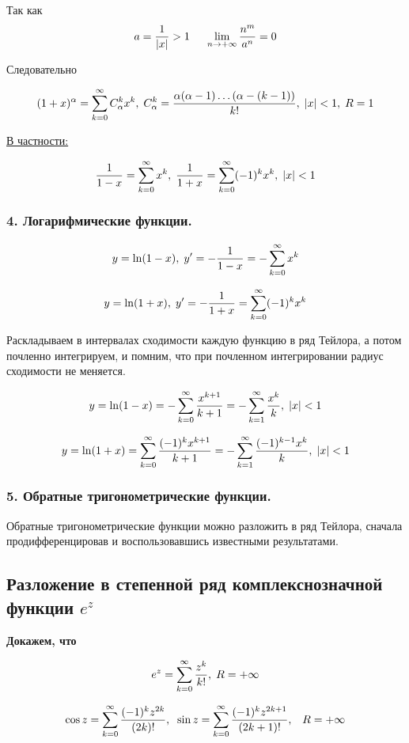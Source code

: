 Так как 
$$
a = \frac{1}{|x|} > 1 \hspace{0.5cm} \lim_{n \rightarrow + \infty} \frac{n^m}{a^n} = 0$$

Следовательно 

$$
(1 + x)^{\alpha} = \sum^{\infty}_{k = 0} C_{\alpha}^k x^k, \; C_{\alpha}^k = \frac{\alpha (\alpha - 1) \ldots (\alpha - (k -1))}{k!}, \; |x| < 1, \; R = 1 
$$

\underline{В частности:}

$$
\frac{1}{1 - x} = \sum^{\infty}_{k = 0} x^k, \; \frac{1}{1 + x} = \sum^{\infty}_{k = 0} (-1)^k x^k, \; |x| < 1
$$

\subsubsection*{4. Логарифмические функции.}



$$
y = \ln(1 - x), \; y' = - \frac{1}{1 - x} = - \sum^{\infty}_{k = 0} x^k
$$

$$
y = \ln(1 + x), \; y' = - \frac{1}{1 + x} = \sum^{\infty}_{k = 0} (-1)^k x^k
$$

Раскладываем в интервалах сходимости каждую функцию в ряд Тейлора, а потом почленно интегрируем, и помним, что при почленном интегрировании радиус сходимости не меняется. 

$$ 
y = \ln(1 - x) = - \sum^{\infty}_{k = 0} \frac{x^{k + 1}}{k + 1} = - \sum^{\infty}_{k = 1} \frac{x^k}{k}, \; |x| < 1
$$

$$
y = \ln(1 + x) = \sum^{\infty}_{k = 0} \frac{(-1)^k x^{k + 1}}{k + 1} = - \sum^{\infty}_{k = 1} \frac{(-1)^{k - 1} x^k}{k}, \; |x| < 1
$$
\subsubsection*{5. Обратные тригонометрические функции.}

Обратные тригонометрические функции можно разложить в ряд Тейлора, сначала продифференцировав и воспользовавшись известными результатами.

\subsection*{Разложение в степенной ряд комплекснозначной функции $e^z$}

\textbf{Докажем, что} 

$$
e^z = \sum^{\infty}_{k = 0} \frac{z^k}{k!}, \; R = + \infty
$$

$$
\cos z = \sum^{\infty}_{k = 0} \frac{(-1)^k z^{2k}}{(2k)!}, \;\; \sin z = \sum^{\infty}_{k = 0} \frac{(-1)^k z^{2k + 1}}{(2k + 1)!}, \;\;\; R = + \infty
$$

